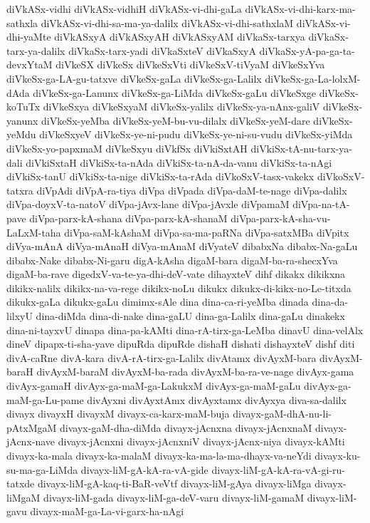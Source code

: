 {diVkASx-vidhi
diVkASx-vidhiH
diVkASx-vi-dhi-gaLa
diVkASx-vi-dhi-karx-ma-sathxla
diVkASx-vi-dhi-sa-ma-ya-dalilx
diVkASx-vi-dhi-sathxlaM
diVkASx-vi-dhi-yaMte
diVkASxyA
diVkASxyAH
diVkASxyAM
diVkaSx-tarxya
diVkaSx-tarx-ya-dalilx
diVkaSx-tarx-yadi
diVkaSxteV
diVkaSxyA
diVkaSx-yA-pa-ga-ta-devxYtaM
diVkeSX
diVkeSx
diVkeSxVti
diVkeSxV-tiVyaM
diVkeSxYva
diVkeSx-ga-LA-gu-tatxve
diVkeSx-gaLa
diVkeSx-ga-Lalilx
diVkeSx-ga-La-lolxM-dAda
diVkeSx-ga-Lanunx
diVkeSx-ga-LiMda
diVkeSx-gaLu
diVkeSxge
diVkeSx-koTuTx
diVkeSxya
diVkeSxyaM
diVkeSx-yalilx
diVkeSx-ya-nAnx-galiV
diVkeSx-yanunx
diVkeSx-yeMba
diVkeSx-yeM-bu-vu-dilalx
diVkeSx-yeM-dare
diVkeSx-yeMdu
diVkeSxyeV
diVkeSx-ye-ni-pudu
diVkeSx-ye-ni-su-vudu
diVkeSx-yiMda
diVkeSx-yo-papxmaM
diVkeSxyu
diVkfSx
diVkiSxtAH
diVkiSx-tA-nu-tarx-ya-dali
diVkiSxtaH
diVkiSx-ta-nAda
diVkiSx-ta-nA-da-vanu
diVkiSx-ta-nAgi
diVkiSx-tanU
diVkiSx-ta-nige
diVkiSx-ta-rAda
diVkoSxV-tasx-vakekx
diVkoSxV-tatxra
diVpAdi
diVpA-ra-tiya
diVpa
diVpada
diVpa-daM-te-nage
diVpa-dalilx
diVpa-doyxV-ta-natoV
diVpa-jAvx-lane
diVpa-jAvxle
diVpamaM
diVpa-na-tA-pave
diVpa-parx-kA-shana
diVpa-parx-kA-shanaM
diVpa-parx-kA-sha-vu-LaLxM-taha
diVpa-saM-kAshaM
diVpa-sa-ma-paRNa
diVpa-satxMBa
diVpitx
diVya-mAnA
diVya-mAnaH
diVya-mAnaM
diVyateV
dibabxNa
dibabx-Na-gaLu
dibabx-Nake
dibabx-Ni-garu
digA-kAsha
digaM-bara
digaM-ba-ra-shecxYva
digaM-ba-rave
digedxV-va-te-ya-dhi-deV-vate
dihayxteV
dihf
dikakx
dikikxna
dikikx-nalilx
dikikx-na-va-rege
dikikx-noLu
dikukx
dikukx-di-kikx-no-Le-titxda
dikukx-gaLa
dikukx-gaLu
dimimx-sAle
dina
dina-ca-ri-yeMba
dinada
dina-da-lilxyU
dina-diMda
dina-di-nake
dina-gaLU
dina-ga-Lalilx
dina-gaLu
dinakekx
dina-ni-tayxvU
dinapa
dina-pa-kAMti
dina-rA-tirx-ga-LeMba
dinavU
dina-velAlx
dineV
dipapx-ti-sha-yave
dipuRda
dipuRde
dishaH
dishati
dishayxteV
dishf
diti
divA-caRne
divA-kara
divA-rA-tirx-ga-Lalilx
divAtamx
divAyxM-bara
divAyxM-baraH
divAyxM-baraM
divAyxM-ba-rada
divAyxM-ba-ra-ve-nage
divAyx-gama
divAyx-gamaH
divAyx-ga-maM-ga-LakukxM
divAyx-ga-maM-gaLu
divAyx-ga-maM-ga-Lu-pame
divAyxni
divAyxtAmx
divAyxtamx
divAyxya
diva-sa-dalilx
divayx
divayxH
divayxM
divayx-ca-karx-maM-buja
divayx-gaM-dhA-nu-li-pAtxMgaM
divayx-gaM-dha-diMda
divayx-jAcnxna
divayx-jAcnxnaM
divayx-jAcnx-nave
divayx-jAcnxni
divayx-jAcnxniV
divayx-jAcnx-niya
divayx-kAMti
divayx-ka-mala
divayx-ka-malaM
divayx-ka-ma-la-ma-dhayx-va-neYdi
divayx-ku-su-ma-ga-LiMda
divayx-liM-gA-kA-ra-vA-gide
divayx-liM-gA-kA-ra-vA-gi-ru-tatxde
divayx-liM-gA-kaq-ti-BaR-veVtf
divayx-liM-gAya
divayx-liMga
divayx-liMgaM
divayx-liM-gada
divayx-liM-ga-deV-varu
divayx-liM-gamaM
divayx-liM-gavu
divayx-maM-ga-La-vi-garx-ha-nAgi
}
